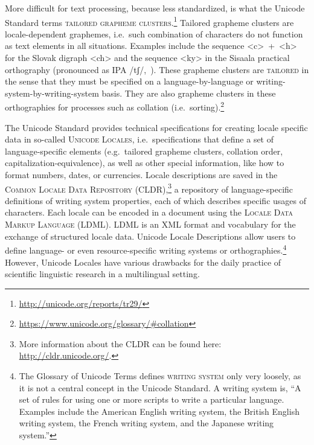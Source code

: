 More difficult for text processing, because less standardized, is what the
Unicode Standard terms \textsc{tailored grapheme clusters}.\footnote{\url{http://unicode.org/reports/tr29/}} 
Tailored grapheme clusters are locale-dependent graphemes, i.e.~such combination of characters do
not function as text elements in all situations. Examples include the sequence
<c>~+~<h> for the Slovak digraph <ch> and the sequence <ky> in the Sisaala
practical orthography (pronounced as IPA /tʃ/,~\cite{Moran2006}). These grapheme
clusters are \textsc{tailored} in the sense that they must be specified on a
language-by-language or writing-system-by-writing-system basis. They are also 
grapheme clusters in these orthographies for processes such as collation (i.e.\ sorting).\footnote{\url{https://www.unicode.org/glossary/\#collation}}

The Unicode Standard provides technical specifications for creating locale specific data
in so-called \textsc{Unicode Locales}, i.e.~specifications 
that define a set of language-specific elements (e.g.~tailored grapheme
clusters, collation order, capitalization-equivalence), as well as other special
information, like how to format numbers, dates, or currencies. Locale
descriptions are saved in the \textsc{Common Locale Data Repository
(CLDR)},\footnote{More information about the CLDR can be found here:
\url{http://cldr.unicode.org/}.} a repository of
language-specific definitions of writing system properties, each of which
describes specific usages of characters. Each locale can be encoded in a
document using the \textsc{Locale Data Markup Language (LDML)}. LDML is an XML
format and vocabulary for the exchange of structured locale data. Unicode Locale
Descriptions allow users to define language- or even resource-specific writing
systems or orthographies.\footnote{The Glossary of Unicode Terms defines \textsc{writing
system} only very loosely, as it is not a central concept in the Unicode
Standard. A writing system is, ``A set of rules for using one or more scripts to
write a particular language. Examples include the American English writing
system, the British English writing system, the French writing system, and the
Japanese writing system.''} However, Unicode Locales have various drawbacks 
for the daily practice of scientific linguistic research in a multilingual setting.
